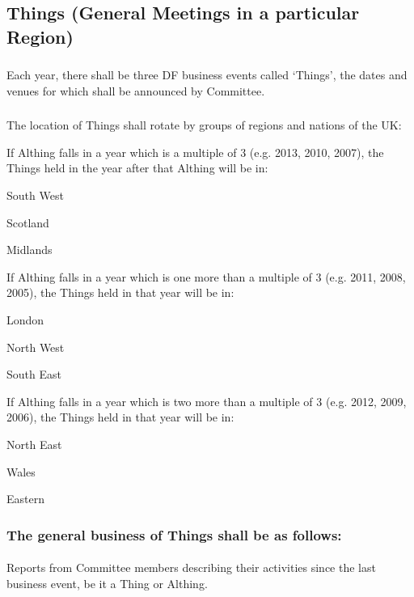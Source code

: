 \documentclass[a4paper, 11pt]{report}
\begin{document}
\subsection{Things (General Meetings in a particular Region)}
\subsubsection{}
Each year, there shall be three DF business events called `Things', the dates and venues for which shall be announced by Committee.
\subsubsection{}
The location of Things shall rotate by groups of regions and nations of the UK:

If Althing falls in a year which is a multiple of 3 (e.g. 2013, 2010, 2007), the Things held in the year after that Althing will be in:
\begin{itemize*}
\item South West
\item Scotland
\item Midlands
\end{itemize*}

If Althing falls in a year which is one more than a multiple of 3 (e.g. 2011, 2008, 2005), the Things held in that year will be in:
\begin{itemize*}
\item London
\item North West
\item South East
\end{itemize*}

If Althing falls in a year which is two more than a multiple of 3 (e.g. 2012, 2009, 2006), the Things held in that year will be in:
\begin{itemize*}
\item North East
\item Wales
\item Eastern
\end{itemize*}

\subsubsection{The general business of Things shall be as follows:}
\paragraph{}
Reports from Committee members describing their activities since the last business event, be it a Thing or Althing.
\end{document}
